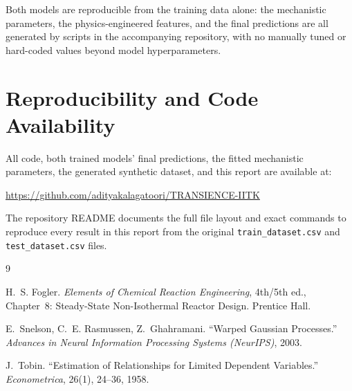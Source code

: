 \documentclass[11pt,a4paper]{article}
\begin{document}
Both models are reproducible from the training data alone: the mechanistic parameters, the
physics-engineered features, and the final predictions are all generated by scripts in the
accompanying repository, with no manually tuned or hard-coded values beyond model
hyperparameters.

\section{Reproducibility and Code Availability}

All code, both trained models' final predictions, the fitted mechanistic parameters, the
generated synthetic dataset, and this report are available at:

\begin{center}
\url{https://github.com/adityakalagatoori/TRANSIENCE-IITK}
\end{center}

\noindent The repository README documents the full file layout and exact commands to reproduce
every result in this report from the original \texttt{train\_dataset.csv} and
\texttt{test\_dataset.csv} files.

\begin{thebibliography}{9}

H.~S. Fogler. \emph{Elements of Chemical Reaction Engineering}, 4th/5th ed., Chapter~8:
Steady-State Non-Isothermal Reactor Design. Prentice Hall.

E.~Snelson, C.~E. Rasmussen, Z.~Ghahramani. ``Warped Gaussian Processes.''
\emph{Advances in Neural Information Processing Systems (NeurIPS)}, 2003.

J.~Tobin. ``Estimation of Relationships for Limited Dependent Variables.''
\emph{Econometrica}, 26(1), 24--36, 1958.

\end{thebibliography}
\end{document}
